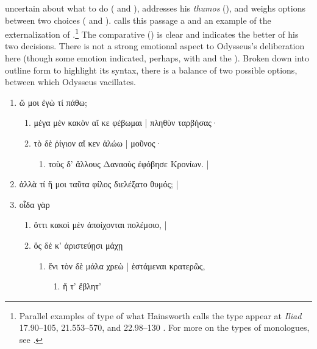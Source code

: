 \documentclass[12pt,letterpaper,oneside,final]{memoir}
\begin{document}
uncertain about what to do ( and ), addresses his \emph{thumos} (), and weighs options between two choices ( and ). \textcite{hainsworth1993} calls this passage a  and an example of the externalization of .\footnote{Parallel examples of type of what Hainsworth calls the  type appear at \emph{Iliad} 17.90--105, 21.553--570, and 22.98--130 \parencite[270]{hainsworth1993}. For more on the types of monologues, see \textcite{fenik1978}.} The comparative () is clear and indicates the better of his two decisions. There is not a strong emotional aspect to Odysseus's deliberation here (though some emotion indicated, perhaps, with  and the ). Broken down into outline form to highlight its syntax, there is a balance of two possible options, between which Odysseus vacillates. \begin{greek} \begin{enumerate} \SingleSpacing
\item ὤ μοι ἐγὼ τί πάθω; 
  \begin{enumerate}
  \item μέγα μὲν κακὸν αἴ κε φέβωμαι | πληθὺν ταρβήσας· 
  \item τὸ δὲ ῥίγιον αἴ κεν ἁλώω | μοῦνος· 
    \begin{enumerate}
    \item τοὺς δ' ἄλλους Δαναοὺς ἐφόβησε Κρονίων. |
    \end{enumerate}
  \end{enumerate}
\item ἀλλὰ τί ἤ μοι ταῦτα φίλος διελέξατο θυμός; |
\item οἶδα γὰρ 
  \begin{enumerate} 
  \item ὅττι κακοὶ μὲν ἀποίχονται πολέμοιο, | 
  \item ὃς δέ κ' ἀριστεύῃσι μάχῃ 
    \begin{enumerate} 
    \item ἔνι τὸν δὲ μάλα χρεὼ | ἑστάμεναι κρατερῶς, 
      \begin{enumerate} 
      \item ἤ τ' ἔβλητ' 

\end{enumerate}
\end{enumerate}
\end{enumerate}
\end{enumerate}
\end{greek}
\end{document}
